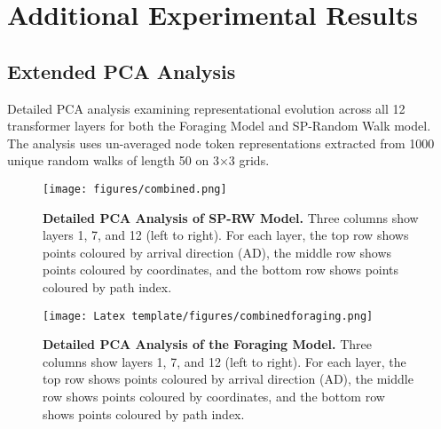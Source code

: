 \section{Additional Experimental Results}
\subsection{Extended PCA Analysis}





Detailed PCA analysis examining representational evolution across all 12 transformer layers for both the Foraging Model and SP-Random Walk model. The analysis uses un-averaged node token representations extracted from 1000 unique random walks of length 50 on 3×3 grids.

\begin{figure}[H]
\centering
\texttt{[image: figures/combined.png]}
\caption[Detailed PCA Analysis of the SP-RW Model.]{\textbf{Detailed PCA Analysis of SP-RW Model.} Three columns show layers 1, 7, and 12 (left to right). For each layer, the top row shows points coloured by arrival direction (AD), the middle row shows points coloured by coordinates, and the bottom row shows points coloured by path index.}
\label{fig:sprw_detailed_pca}
\end{figure}

\begin{figure}[H]
\centering
\texttt{[image: Latex template/figures/combinedforaging.png]}
\caption[Detailed PCA Analysis of the Foraging Model]{\textbf{Detailed PCA Analysis of the Foraging Model.} Three columns show layers 1, 7, and 12 (left to right). For each layer, the top row shows points coloured by arrival direction (AD), the middle row shows points coloured by coordinates, and the bottom row shows points coloured by path index.}
\label{fig:foraging_detailed_pca}
\end{figure}

